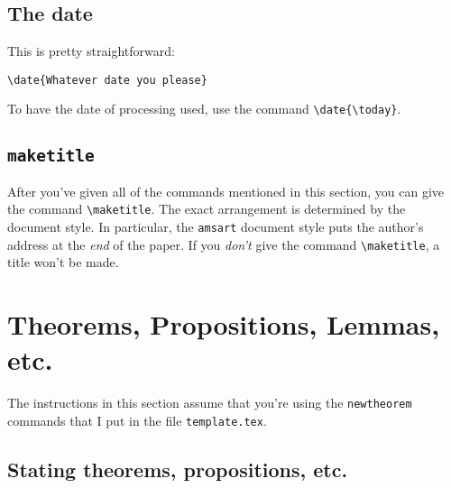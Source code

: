 
\subsection{The date}

This is pretty straightforward:
\begin{center}
\verb"\date{Whatever date you please}"
\end{center}
To have the date of processing used, use the command
\verb"\date{\today}".

\subsection{{\tt maketitle}}


After you've given all of the commands mentioned in this section, you
can give the command \verb"\maketitle".  The exact arrangement is
determined by the document style.  In particular, the \verb"amsart"
document style puts the author's address at the {\em end\/} of the
paper.  If you {\em don't\/} give
the command \verb"\maketitle", a title won't be made.



\section{Theorems, Propositions, Lemmas, etc.}

The instructions in this section assume that you're using the
\verb"newtheorem" commands that I put in the file
\verb"template.tex".

\subsection{Stating theorems, propositions, etc.}

